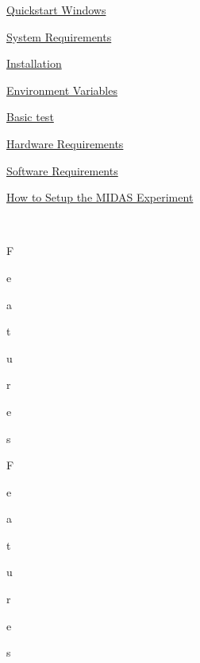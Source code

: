 \begin{TabularC}{2}
\begin{TabularC}{2}
\begin{DoxyItemize}
\item \hyperlink{Q_Windows}{Quickstart Windows} 
\begin{DoxyItemize}
\item \hyperlink{Q_Windows_Q_Windows_system_requirements}{System Requirements} 
\item \hyperlink{Q_Windows_Q_Windows_installation}{Installation} 
\begin{DoxyItemize}
\item \hyperlink{Q_Windows_Q_Windows_Environment_Variables}{Environment Variables} 
\end{DoxyItemize}
\item \hyperlink{Q_Windows_Q_Windows_Basic_Test}{Basic test} 
\begin{DoxyItemize}
\item \hyperlink{Q_Windows_Q_Windows_Hardware_Requirements}{Hardware Requirements} 
\item \hyperlink{Q_Windows_Q_Windows_Software_Requirements}{Software Requirements} 
\item \hyperlink{Q_Windows_Q_Windows_Expt_Setup}{How to Setup the MIDAS Experiment} 
\end{DoxyItemize}
\end{DoxyItemize}
\end{DoxyItemize}\\
 \par
\par
\par
F\par
e\par
a\par
t\par
u\par
r\par
e\par
s\par
 \par
 \par
\par
\par
F\par
e\par
a\par
t\par
u\par
r\par
e\par
s\par
 \par
 \par
\par
\par

\end{TabularC}
\end{TabularC}
